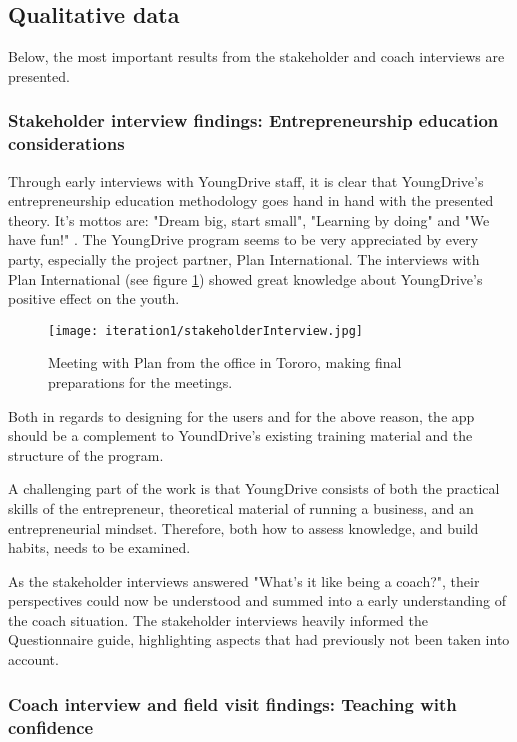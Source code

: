\subsection{Qualitative data}

Below, the most important results from the stakeholder and coach interviews are presented.

\subsubsection{Stakeholder interview findings: Entrepreneurship education considerations}
Through early interviews with YoungDrive staff, it is clear that YoungDrive's entrepreneurship education methodology goes hand in hand with the presented theory. It's mottos are: "Dream big, start small", "Learning by doing" and "We have fun!" \citep{youngdrive-manual}. The YoungDrive program seems to be very appreciated by every party, especially the project partner, Plan International. The interviews with Plan International (see figure \ref{fig:stakeholderInterview}) showed great knowledge about YoungDrive's positive effect on the youth.

\begin{figure}[h]
  \centering
  \texttt{[image: iteration1/stakeholderInterview.jpg]}
  \caption{Meeting with Plan from the office in Tororo, making final preparations for the meetings.}
  \label{fig:stakeholderInterview}
\end{figure}

Both in regards to designing for the users and for the above reason, the app should be a complement to YoundDrive's existing training material and the structure of the program.

A challenging part of the work is that YoungDrive consists of both the practical skills of the entrepreneur, theoretical material of running a business, and an entrepreneurial mindset. Therefore, both how to assess knowledge, and build habits, needs to be examined.

As the stakeholder interviews answered "What's it like being a coach?", their perspectives could now be understood and summed into a early understanding of the coach situation. The stakeholder interviews heavily informed the Questionnaire guide, highlighting aspects that had previously not been taken into account.

\subsubsection{Coach interview and field visit findings: Teaching with confidence}

